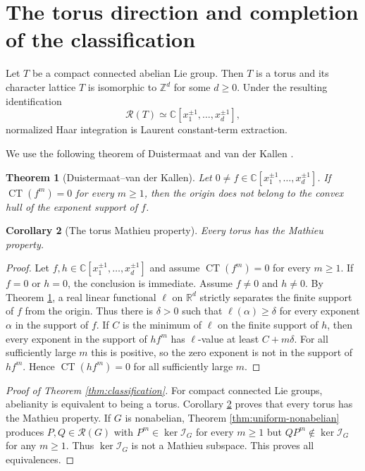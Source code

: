 \documentclass[11pt]{article}
\numberwithin{equation}{section}
\newtheorem{theorem}{Theorem}[section]
\newtheorem{corollary}[theorem]{Corollary}
\newcommand{\C}{\mathbb C}
\newcommand{\R}{\mathbb R}
\newcommand{\cR}{\mathcal R}
\newcommand{\cI}{\mathcal I}
\newcommand{\CT}{\operatorname{CT}}
\begin{document}
\section{The torus direction and completion of the classification}

Let $T$ be a compact connected abelian Lie group.  Then $T$ is a torus and
its character lattice $\widehat T$ is isomorphic to $\mathbb Z^d$ for some
$d\geq0$.  Under the resulting identification
\[
 \cR(T)\simeq\C[x_1^{\pm1},\ldots,x_d^{\pm1}],
\]
normalized Haar integration is Laurent constant-term extraction.

We use the following theorem of Duistermaat and van der Kallen
\cite{DuistermaatVanderKallen1998}.

\begin{theorem}[Duistermaat--van der Kallen]\label{thm:dvdk}
Let $0\neq f\in\C[x_1^{\pm1},\ldots,x_d^{\pm1}]$.  If
$\CT(f^m)=0$ for every $m\geq1$, then the origin does not belong to the convex
hull of the exponent support of $f$.
\end{theorem}

\begin{corollary}[The torus Mathieu property]\label{cor:torus}
Every torus has the Mathieu property.
\end{corollary}

\begin{proof}
Let $f,h\in\C[x_1^{\pm1},\ldots,x_d^{\pm1}]$ and assume
$\CT(f^m)=0$ for every $m\geq1$.  If $f=0$ or $h=0$, the conclusion is immediate.
Assume $f\neq0$ and $h\neq0$.  By Theorem \ref{thm:dvdk}, a real linear
functional $\ell$ on $\R^d$ strictly separates the finite support of $f$ from
the origin.  Thus there is $\delta>0$ such that
$\ell(\alpha)\geq\delta$ for every exponent $\alpha$ in the support of $f$.
If $C$ is the minimum of $\ell$ on the finite support of $h$, then every
exponent in the support of $hf^m$ has $\ell$-value at least $C+m\delta$.
For all sufficiently large $m$ this is positive, so the zero exponent is not
in the support of $hf^m$.  Hence $\CT(hf^m)=0$ for all sufficiently large
$m$.
\end{proof}

\begin{proof}[Proof of Theorem \ref{thm:classification}]
For compact connected Lie groups, abelianity is equivalent to being a torus.
Corollary \ref{cor:torus} proves that every torus has the Mathieu property.
If $G$ is nonabelian, Theorem \ref{thm:uniform-nonabelian} produces
$P,Q\in\cR(G)$ with $P^m\in\ker\cI_G$ for every $m\geq1$ but
$QP^m\notin\ker\cI_G$ for any $m\geq1$.  Thus $\ker\cI_G$ is not a Mathieu
subspace.  This proves all equivalences.
\end{proof}
\end{document}
